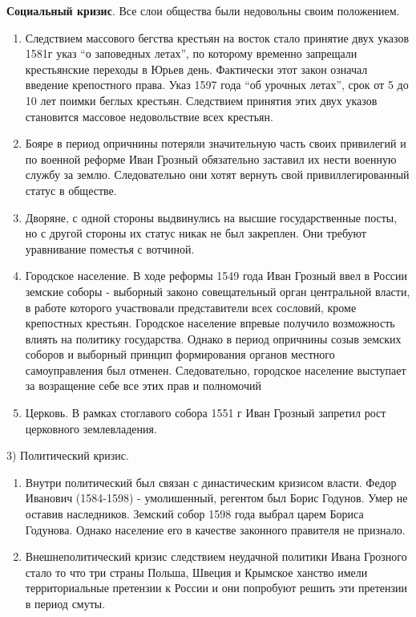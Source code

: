 \documentclass[a4paper]{article}
\begin{document}
    \textbf{Социальный кризис}. Все слои общества были недовольны своим положением.
            \begin{enumerate}
                \item Следствием массового бегства крестьян на восток стало принятие двух указов 1581г указ ``о заповедных летах'', по которому временно запрещали крестьянские переходы в Юрьев день. Фактически этот закон означал введение крепостного права. Указ 1597 года ``об урочных летах'', срок от 5 до 10 лет поимки беглых крестьян. Следствием принятия этих двух указов становится массовое недовольствие всех крестьян.

                \item Бояре в период опричнины потеряли значительную часть своих привилегий и по военной реформе Иван Грозный обязательно заставил их нести военную службу за землю. Следовательно они хотят вернуть свой привиллегированный статус в обществе.

                \item Дворяне, с одной стороны выдвинулись на высшие государственные посты, но с другой стороны их статус никак не был закреплен. Они требуют уравнивание поместья с вотчиной.

                \item Городское население. В ходе реформы 1549 года Иван Грозный ввел в России земские соборы - выборный законо совещательный орган центральной власти, в работе которого участвовали представители всех сословий, кроме крепостных крестьян. Городское население впревые получило возможность влиять на политику государства. Однако в период опричнины созыв земских соборов и выборный принцип формирования органов местного самоуправления был отменен. Следовательно, городское население выступает за возращение себе все этих прав и полномочий

                \item Церковь. В рамках стоглавого собора 1551 г Иван Грозный запретил рост церковного землевладения.
            \end{enumerate}

        3) Политический кризис.
            \begin{enumerate}
                \item Внутри политический был связан с династическим кризисом власти. Федор Иванович (1584-1598) - умолишенный, регентом был Борис Годунов. Умер не оставив наследников. Земский собор 1598 года выбрал царем Бориса Годунова. Однако население его в качестве законного правителя не признало.
                \item Внешнеполитический кризис следствием неудачной политики Ивана Грозного стало то что три страны Польша, Швеция и Крымское ханство имели территориальные претензии к России и они попробуют решить эти претензии в период смуты.
            \end{enumerate}
\end{document}
